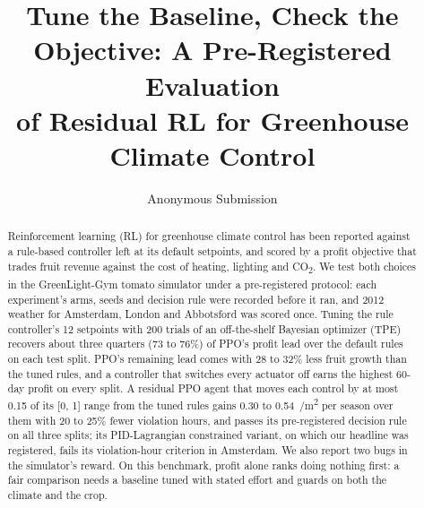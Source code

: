 \documentclass[letterpaper]{article} %
\title{Tune the Baseline, Check the Objective: A Pre-Registered Evaluation\\of Residual RL for Greenhouse Climate Control}
\author{Anonymous Submission}
\newcommand{\cotwo}{CO\textsubscript{2}}
\newcommand{\eurm}{\texteuro/m\textsuperscript{2}}
\begin{document}
\maketitle

\begin{abstract}
Reinforcement learning (RL) for greenhouse climate control has been reported against a rule-based controller left at its default setpoints, and scored by a profit objective that trades fruit revenue against the cost of heating, lighting and \cotwo{}. We test both choices in the GreenLight-Gym tomato simulator under a pre-registered protocol: each experiment's arms, seeds and decision rule were recorded before it ran, and 2012 weather for Amsterdam, London and Abbotsford was scored once.
Tuning the rule controller's 12 setpoints with 200 trials of an off-the-shelf Bayesian optimizer (TPE) recovers about three quarters (73 to 76\%) of PPO's profit lead over the default rules on each test split.
PPO's remaining lead comes with 28 to 32\% less fruit growth than the tuned rules, and a controller that switches every actuator off earns the highest 60-day profit on every split.
A residual PPO agent that moves each control by at most 0.15 of its [0, 1] range from the tuned rules gains 0.30 to 0.54~\eurm{} per season over them with 20 to 25\% fewer violation hours, and passes its pre-registered decision rule on all three splits; its PID-Lagrangian constrained variant, on which our headline was registered, fails its violation-hour criterion in Amsterdam. We also report two bugs in the simulator's reward. On this benchmark, profit alone ranks doing nothing first: a fair comparison needs a baseline tuned with stated effort and guards on both the climate and the crop.
\end{abstract}
\end{document}
